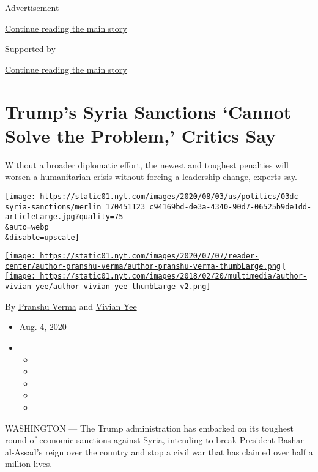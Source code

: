 Advertisement

\protect\hyperlink{after-top}{Continue reading the main story}

Supported by

\protect\hyperlink{after-sponsor}{Continue reading the main story}

\hypertarget{trumps-syria-sanctions-cannot-solve-the-problem-critics-say}{%
\section{Trump's Syria Sanctions `Cannot Solve the Problem,' Critics
Say}\label{trumps-syria-sanctions-cannot-solve-the-problem-critics-say}}

Without a broader diplomatic effort, the newest and toughest penalties
will worsen a humanitarian crisis without forcing a leadership change,
experts say.

\texttt{[image: https://static01.nyt.com/images/2020/08/03/us/politics/03dc-syria-sanctions/merlin\_170451123\_c94169bd-de3a-4340-90d7-06525b9de1dd-articleLarge.jpg?quality=75\\\&auto=webp\\\&disable=upscale]}

\href{https://www.nytimes.com/by/pranshu-verma}{\texttt{[image: https://static01.nyt.com/images/2020/07/07/reader-center/author-pranshu-verma/author-pranshu-verma-thumbLarge.png]}}\href{https://www.nytimes.com/by/vivian-yee}{\texttt{[image: https://static01.nyt.com/images/2018/02/20/multimedia/author-vivian-yee/author-vivian-yee-thumbLarge-v2.png]}}

By \href{https://www.nytimes.com/by/pranshu-verma}{Pranshu Verma} and
\href{https://www.nytimes.com/by/vivian-yee}{Vivian Yee}

\begin{itemize}
\item
  Aug. 4, 2020
\item
  \begin{itemize}
  \item
  \item
  \item
  \item
  \item
  \end{itemize}
\end{itemize}

WASHINGTON --- The Trump administration has embarked on its toughest
round of economic sanctions against Syria, intending to break President
Bashar al-Assad's reign over the country and stop a civil war that has
claimed over half a million lives.

